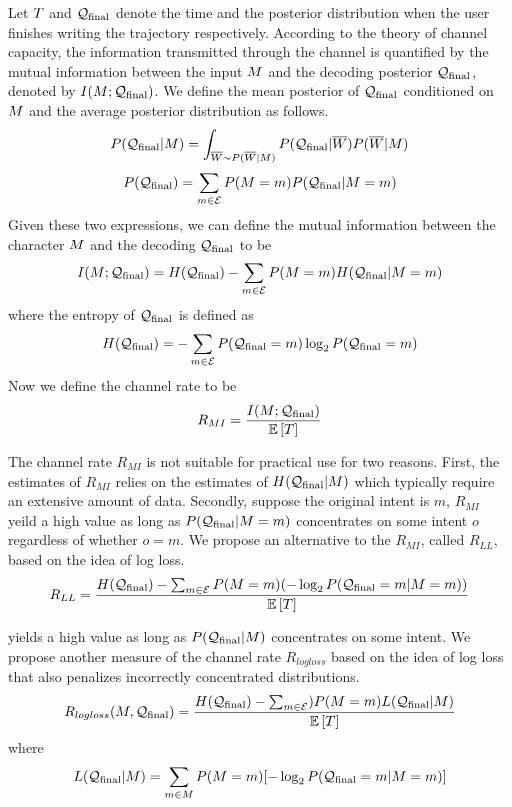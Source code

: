 \documentclass{sigchi}
\begin{document}
Let $T$ and $\mathcal{Q}_{\mathrm{final}}$ denote the time and the posterior
distribution when the user finishes writing the trajectory
respectively.  According to the theory of channel capacity, the
information transmitted through the channel is quantified by the
mutual information between the input $M$ and the decoding
posterior $\mathcal{Q}_{\mathrm{final}}$, denoted by $I(M ; \mathcal{Q}_{\mathrm{final}})$. We
define the mean posterior of $\mathcal{Q}_{\mathrm{final}}$ conditioned on $M$ and
the average posterior distribution as follows.
\[
P(\mathcal{Q}_{\mathrm{final}} | M) =
\int_{\overline{W} \sim P(\overline{W} | M)} { P(\mathcal{Q}_{\mathrm{final}} | \overline{W})
P(\overline{W} | M)} 
\]
\[
P(\mathcal{Q}_{\mathrm{final}})
=
\sum_{m \in \mathcal{E}} 
P(M = m) P(\mathcal{Q}_{\mathrm{final}} | M = m)
\]
Given these two expressions, we can define the mutual information
between the character $M$ and the decoding $\mathcal{Q}_{\mathrm{final}}$ to be 
\[
I(M ; \mathcal{Q}_{\mathrm{final}}) = H(\mathcal{Q}_{\mathrm{final}}) - \sum_{m \in \mathcal{E}}
P(M = m) H(\mathcal{Q}_{\mathrm{final}} | M = m)
\]
where the entropy of $\mathcal{Q}_{\mathrm{final}}$ is defined as
\[
H(\mathcal{Q}_{\mathrm{final}}) = -\sum_{m \in \mathcal{E}} {
P(\mathcal{Q}_{\mathrm{final}} = m) \log_2 P(\mathcal{Q}_{\mathrm{final}} = m)}
\]
Now we define the channel rate to be 
\begin{align}
\label{eq:channel_rate}
R_{MI}
= 
\frac{I( M ;  \mathcal{Q}_{\mathrm{final}})}{\mathbb{E} \left[T\right]}
\end{align}

The channel rate $R_{MI}$ is not suitable for practical use for two
reasons. First, the estimates of $R_{MI}$ relies on the estimates of
$H(\mathcal{Q}_{\mathrm{final}} | M)$ which typically require an extensive amount
of data. Secondly, suppose the original intent is $m$, $R_{MI}$ yeild a high value as long as
$P(\mathcal{Q}_{\mathrm{final}} | M = m)$ concentrates on some intent $o$ regardless
of whether $o = m$.  We propose an alternative to the $R_{MI}$, called
$R_{LL}$, based on the idea of log loss.
\[
R_{LL} = \frac{H(\mathcal{Q}_{\mathrm{final}}) - \sum_{m \in \mathcal{E}}
P(M = m) (-\log_2 P(\mathcal{Q}_{\mathrm{final}} = m | M = m))}{\mathbb{E} \left[T\right]}
\]








yields a high value as long as $P(\mathcal{Q}_{\mathrm{final}} |
M)$ concentrates on some intent. We propose another measure of
the channel rate $R_{logloss}$ based on the idea of log loss that
also penalizes incorrectly concentrated distributions.
\[
R_{logloss}(M, \mathcal{Q}_{\mathrm{final}})
=
\frac{H(\mathcal{Q}_{\mathrm{final}}) - \sum_{m \in \mathcal{E}})
P(M = m) L(\mathcal{Q}_{\mathrm{final}} | M)}{\mathbb{E} \left[T\right]}
\]
where
\[
L(\mathcal{Q}_{\mathrm{final}} | M) 
=  
\sum_{m \in M} P(M = m) [ - \log_2 P(\mathcal{Q}_{\mathrm{final}} = m |
M = m) ]
\]
\end{document}
